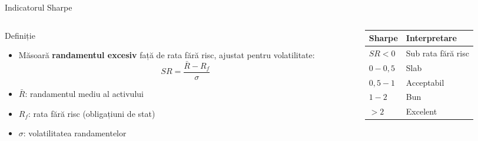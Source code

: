 \documentclass[9pt, aspectratio=169, t]{beamer}
\begin{document}
\begin{frame}[shrink=15]{Indicatorul Sharpe}
    \begin{cminipage}{0.95\textwidth}
    \begin{columns}[T]
    \begin{column}{0.48\textwidth}
    \begin{block}{Definiție}
    \begin{itemize}\setlength{\itemsep}{0pt}
        \item Măsoară \textbf{randamentul excesiv} față de rata fără risc, ajustat pentru volatilitate:
        \[
        SR = \frac{\bar{R} - R_f}{\sigma}
        \]
        \item $\bar{R}$: randamentul mediu al activului
        \item $R_f$: rata fără risc (obligațiuni de stat)
        \item $\sigma$: volatilitatea randamentelor
    \end{itemize}
    \end{block}
    \end{column}
    \begin{column}{0.48\textwidth}
    \begin{center}
    {\small\renewcommand{\arraystretch}{1.2}
    \begin{tabular}{>{\centering\arraybackslash}p{1.5cm} >{\centering\arraybackslash}p{2cm}}
    \toprule
    \textbf{Sharpe} & \textbf{Interpretare} \\
    \midrule
    \rowcolor{Crimson!30} $SR < 0$ & Sub rata fără risc \\
    \rowcolor{Orange!30} $0 - 0{,}5$ & Slab \\
    \rowcolor{Amber!30} $0{,}5 - 1$ & Acceptabil \\
    \rowcolor{Forest!20} $1 - 2$ & Bun \\
    \rowcolor{Forest!40} $> 2$ & Excelent \\
    \bottomrule
    \end{tabular}}
    \end{center}
    \end{column}
    \end{columns}
    \end{cminipage}
\end{frame}
\end{document}
